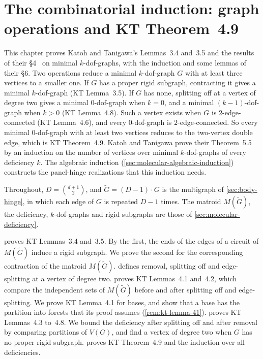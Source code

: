 \section{The combinatorial induction: graph operations and KT Theorem~4.9}
\label{sec:molecular-induction}

This chapter proves Katoh and Tanigawa's Lemmas~3.4 and~3.5 and the
results of their \S4~\cite{katohTanigawa2011} on minimal
$k$-dof-graphs, with the induction and some lemmas of their \S6. Two
operations reduce a minimal $k$-dof-graph $G$ with at least three
vertices to a smaller one. If $G$ has a proper rigid subgraph,
contracting it gives a minimal $k$-dof-graph (KT Lemma~3.5). If $G$ has
none, splitting off at a vertex of degree two gives a minimal
$0$-dof-graph when $k = 0$, and a minimal $(k-1)$-dof-graph when $k > 0$
(KT Lemma~4.8). Such a vertex exists when $G$ is $2$-edge-connected
(KT Lemma~4.6), and every $0$-dof-graph is $2$-edge-connected. So every
minimal $0$-dof-graph with at least two vertices reduces to the
two-vertex double edge, which is KT Theorem~4.9. Katoh and Tanigawa
prove their Theorem~5.5 by an induction on the number of vertices over
minimal $k$-dof-graphs of every deficiency $k$. The algebraic induction
(\cref{sec:molecular-algebraic-induction}) constructs the panel-hinge
realizations that this induction needs.

Throughout, $D = \binom{d+1}{2}$, and $\tilde G = (D-1)\cdot G$ is the
multigraph of \cref{sec:body-hinge}, in which each edge of $G$ is
repeated $D - 1$ times. The matroid $M(\tilde G)$, the deficiency,
$k$-dof-graphs and rigid subgraphs are those of
\cref{sec:molecular-deficiency}.

 proves KT Lemmas~3.4 and~3.5.
By the first, the ends of the edges of a circuit of $M(\tilde G)$ induce
a rigid subgraph. We prove the second for the corresponding contraction
of the matroid $M(\tilde G)$. 
defines removal, splitting off and edge-splitting at a vertex of degree
two.  proves KT Lemmas~4.1
and~4.2, which compare the independent sets of $M(\tilde G)$ before and
after splitting off and edge-splitting. We prove KT Lemma~4.1 for
bases, and show that a base has the partition into forests that its
proof assumes (\cref{rem:kt-lemma-41}).
 proves KT Lemmas~4.3 to~4.8. We bound
the deficiency after splitting off and after removal by comparing
partitions of $V(G)$, and find a vertex of degree two when $G$ has no
proper rigid subgraph.  proves KT
Theorem~4.9 and the induction over all deficiencies.

